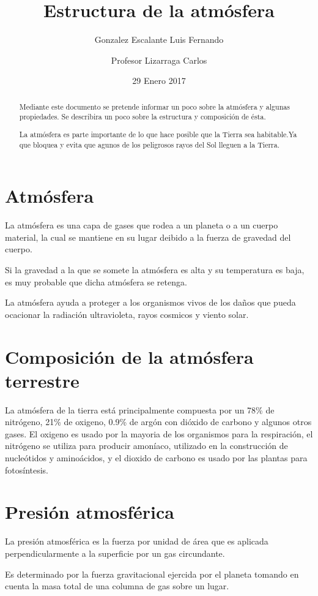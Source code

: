 \documentclass[11pt]{report}
\begin{document}
\title{Estructura de la atmósfera}
\author{Gonzalez Escalante Luis Fernando
\and Profesor Lizarraga Carlos}

\date{29 Enero 2017}
\maketitle
\begin{abstract}
Mediante este documento se pretende informar un poco sobre la atmósfera y algunas propiedades.
Se describira un poco sobre la estructura y composición de ésta.

La atmósfera es parte importante de lo que hace posible que la Tierra sea habitable.Ya que bloquea y evita que agunos de los peligrosos rayos del Sol lleguen a la Tierra.
\end{abstract}
\section*{Atmósfera}
La atmósfera es una capa de gases que rodea a un planeta o a un cuerpo material, la cual se mantiene en su lugar deibido a la fuerza de gravedad del cuerpo.

Si la gravedad a la que se somete la atmósfera es alta y su temperatura es baja, es muy probable que dicha atmósfera se retenga.

La atmósfera ayuda a proteger a los organismos vivos de los daños que pueda ocacionar la radiación ultravioleta, rayos cosmicos y viento solar.

\section*{Composición de la atmósfera terrestre}
La atmósfera de la tierra está principalmente compuesta por un 78\% de nitrógeno, 21\% de oxigeno, 0.9\% de argón con dióxido de carbono y algunos otros gases. El oxigeno es usado por la mayoria de los organismos para la respiración, el nitrógeno se utiliza para producir amoníaco, utilizado en la construcción de nucleótidos y aminoácidos, y el dioxido de carbono es usado por las plantas para fotosíntesis.

\section*{Presión atmosférica}
La presión atmosférica es la fuerza por unidad de área que es aplicada perpendicularmente a la superficie por un gas circundante.

Es determinado por la fuerza gravitacional ejercida por el planeta tomando en cuenta la masa total de una columna de gas sobre un lugar.
\end{document}
